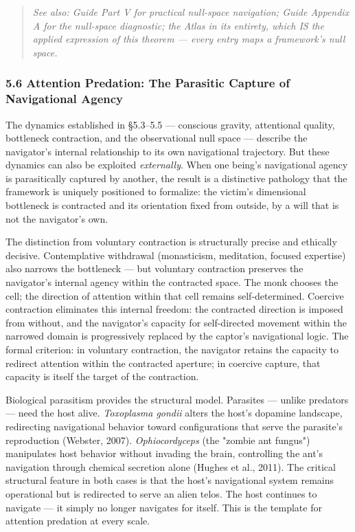 \begin{quote}
\itshape
\textit{See also: Guide Part V for practical null-space navigation; Guide Appendix A for the null-space diagnostic; the Atlas in its entirety, which IS the applied expression of this theorem — every entry maps a framework's null space.}
\end{quote}


\subsubsection*{5.6 Attention Predation: The Parasitic Capture of Navigational Agency}


The dynamics established in §5.3–5.5 — conscious gravity, attentional quality, bottleneck contraction, and the observational null space — describe the navigator's internal relationship to its own navigational trajectory. But these dynamics can also be exploited \textit{externally}. When one being's navigational agency is parasitically captured by another, the result is a distinctive pathology that the framework is uniquely positioned to formalize: the victim's dimensional bottleneck is contracted and its orientation fixed from outside, by a will that is not the navigator's own.


The distinction from voluntary contraction is structurally precise and ethically decisive. Contemplative withdrawal (monasticism, meditation, focused expertise) also narrows the bottleneck — but voluntary contraction preserves the navigator's internal agency within the contracted space. The monk chooses the cell; the direction of attention within that cell remains self-determined. Coercive contraction eliminates this internal freedom: the contracted direction is imposed from without, and the navigator's capacity for self-directed movement within the narrowed domain is progressively replaced by the captor's navigational logic. The formal criterion: in voluntary contraction, the navigator retains the capacity to redirect attention within the contracted aperture; in coercive capture, that capacity is itself the target of the contraction.


Biological parasitism provides the structural model. Parasites — unlike predators — need the host alive. \textit{Toxoplasma gondii} alters the host's dopamine landscape, redirecting navigational behavior toward configurations that serve the parasite's reproduction (Webster, 2007). \textit{Ophiocordyceps} (the "zombie ant fungus") manipulates host behavior without invading the brain, controlling the ant's navigation through chemical secretion alone (Hughes et al., 2011). The critical structural feature in both cases is that the host's navigational system remains operational but is redirected to serve an alien telos. The host continues to navigate — it simply no longer navigates for itself. This is the template for attention predation at every scale.


